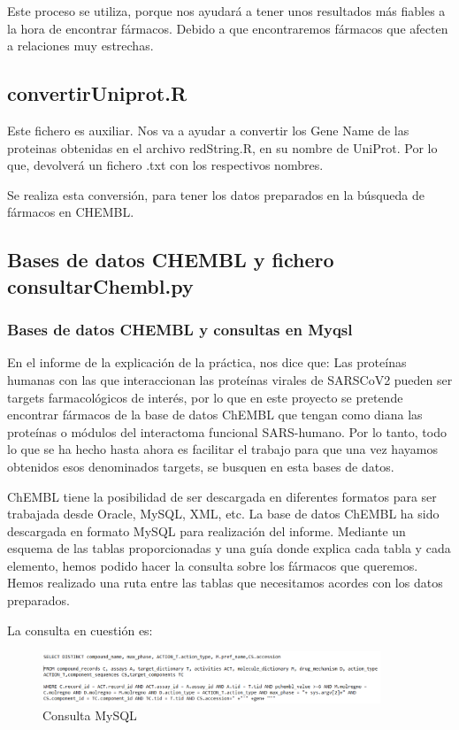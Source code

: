 Este proceso se utiliza, porque nos ayudará a tener unos resultados más fiables a la hora de encontrar fármacos. Debido a que encontraremos fármacos que afecten a relaciones muy estrechas. 

\subsection{convertirUniprot.R}

Este fichero es auxiliar. Nos va a ayudar a convertir los Gene Name de las proteinas obtenidas en el archivo redString.R, en su nombre de UniProt. Por lo que, devolverá un fichero .txt con los respectivos nombres. 

Se realiza esta conversión, para tener los datos preparados en la búsqueda de fármacos en CHEMBL. 

\subsection{Bases de datos CHEMBL y fichero consultarChembl.py}

    \subsubsection{Bases de datos CHEMBL y consultas en Myqsl}
    En el informe de la explicación de la práctica, nos dice que: Las proteínas humanas con las que interaccionan las proteínas virales de SARSCoV2 pueden ser targets farmacológicos de interés, por lo que en este proyecto se pretende encontrar fármacos de la base de datos ChEMBL que tengan como diana las proteínas o módulos del interactoma funcional SARS-humano. Por lo tanto, todo lo que se ha hecho hasta ahora es facilitar el trabajo para que una vez hayamos obtenidos esos denominados targets, se busquen en esta bases de datos. 
    
    ChEMBL tiene la posibilidad de ser descargada en diferentes formatos para ser trabajada desde Oracle, MySQL, XML, etc. La base de datos ChEMBL ha sido descargada en formato MySQL para realización del informe. Mediante un esquema de las tablas proporcionadas y una guía donde explica cada tabla y cada elemento, hemos podido hacer la consulta sobre los fármacos que queremos. Hemos realizado una ruta entre las tablas que necesitamos acordes con los datos preparados. 
    
    La consulta en cuestión es: 
    
		\begin{figure}[h!]
			\includegraphics[width=0.9\textwidth]{figures/Captura.PNG}
			\caption{Consulta MySQL}
			\label{fig:cost_megabase}
		\end{figure}
	\newpage
		
